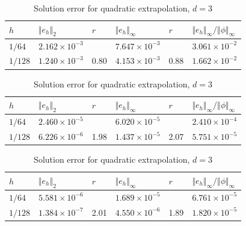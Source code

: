 \documentclass[a4paper,10pt,3p,preprint,pdftex]{elsarticle}
\begin{document}
\begin{table}[htb]
  \begin{center}
    \begin{tabular}{llllll}
      \hline
      $h$ & $\Vert e_h \Vert_2$ & $r$ & $\Vert e_h
      \Vert_\infty$ & $r$ & $\Vert e_h \Vert_\infty /
      \Vert \phi \Vert_\infty$ \\ [0.2ex] \hline 
      \vphantom{\rule{0pt}{2.7ex}}
      $1/64$  & $2.162 \times 10^{-3}$ & & $7.647 \times 10^{-3}$ & &
      $3.061 \times 10^{-2}$ \\ 
      $1/128$ & $1.240 \times 10^{-3}$ & 0.80 & $4.153 \times 10^{-3}$ &
      0.88 & $1.662 \times 10^{-2}$ \\ [0.2ex]
      \hline
    \end{tabular}
    \caption{Solution error for constant extrapolation, $d=3$}
    \label{tbl:rel_error_const}
  \end{center}

  \begin{center}
    \begin{tabular}{llllll}
      \hline
      $h$ & $\Vert e_h \Vert_2$ & $r$ & $\Vert e_h
      \Vert_\infty$ & $r$ & $\Vert e_h \Vert_\infty /
      \Vert \phi \Vert_\infty$\\ [0.2ex]
      \hline 
      \vphantom{\rule{0pt}{2.7ex}}
      $1/64$  & $2.460 \times 10^{-5}$ & & $6.020 \times 10^{-5}$ & &
      $2.410 \times 10^{-4}$ \\
      $1/128$ & $6.226 \times 10^{-6}$ & 1.98 & $1.437 \times 10^{-5}$ &
      2.07 & $5.751 \times 10^{-5}$ \\ [0.2ex]
      \hline
    \end{tabular}
    \caption{Solution error for linear extrapolation, $d=3$}
    \label{tbl:rel_error_lin}
  \end{center}

  \begin{center}
    \begin{tabular}{llllll}
      \hline
      $h$ & $\Vert e_h \Vert_2$ & $r$ & $\Vert e_h
      \Vert_\infty$ & $r$ & $\Vert e_h \Vert_\infty /
      \Vert \phi \Vert_\infty$\\ [0.2ex]
      \hline 
      \vphantom{\rule{0pt}{2.7ex}}
      $1/64$  & $5.581 \times 10^{-6}$ & & $1.689 \times 10^{-5}$ & &
      $6.761 \times 10^{-5}$ \\ 
      $1/128$ & $1.384 \times 10^{-7}$ & 2.01 & $4.550 \times 10^{-6}$ &
      1.89 & $1.820 \times 10^{-5}$ \\ [0.2ex]
      \hline
    \end{tabular}
    \caption{Solution error for quadratic extrapolation, $d=3$}
    \label{tbl:rel_error_quad}
  \end{center}
\end{table}
\end{document}
